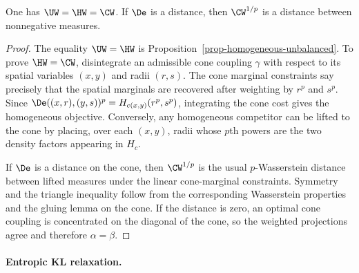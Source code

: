 \begin{thm}\label{thm-cone-unbalanced-ot}
	One has $\UW=\HW=\CW$. If $\De$ is a distance, then $\CW^{1/p}$ is a distance between nonnegative measures.
\end{thm}

\begin{proof}
	The equality $\UW=\HW$ is Proposition~\ref{prop-homogeneous-unbalanced}. To prove $\HW=\CW$, disintegrate an admissible cone coupling $\gamma$ with respect to its spatial variables $(x,y)$ and radii $(r,s)$. The cone marginal constraints say precisely that the spatial marginals are recovered after weighting by $r^p$ and $s^p$. Since $\De((x,r),(y,s))^p=H_{c(x,y)}(r^p,s^p)$, integrating the cone cost gives the homogeneous objective. Conversely, any homogeneous competitor can be lifted to the cone by placing, over each $(x,y)$, radii whose $p$th powers are the two density factors appearing in $H_c$.

	If $\De$ is a distance on the cone, then $\CW^{1/p}$ is the usual $p$-Wasserstein distance between lifted measures under the linear cone-marginal constraints. Symmetry and the triangle inequality follow from the corresponding Wasserstein properties and the gluing lemma on the cone. If the distance is zero, an optimal cone coupling is concentrated on the diagonal of the cone, so the weighted projections agree and therefore $\alpha=\beta$.
\end{proof}

\paragraph{Entropic KL relaxation.}

